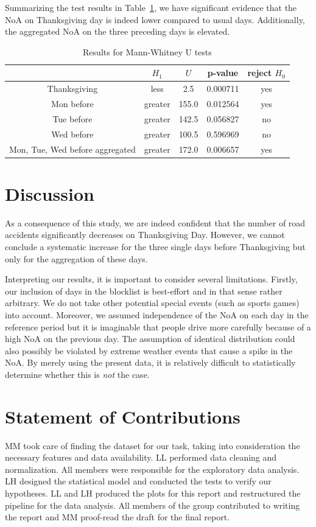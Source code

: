 \documentclass{article}
\begin{document}
Summarizing the test results in Table~\ref{tab:results}, we have significant
evidence that the NoA on Thanksgiving day is indeed lower compared to usual
days. Additionally, the aggregated NoA on the three preceding days is elevated.

\begin{table}[H]
  \centering
  \begin{tabular}{c c c c c}
    \toprule
    & $H_1$ & $U$ & p-value & reject $H_0$ \\
    \midrule
    Thanksgiving & less & 2.5 & 0.000711 & yes \\
    Mon before & greater & 155.0 & 0.012564 & yes \\
    Tue before & greater & 142.5 & 0.056827 & no \\
    Wed before & greater & 100.5 & 0.596969 & no \\
    Mon, Tue, Wed before aggregated & greater & 172.0 & 0.006657 & yes \\
    \bottomrule
  \end{tabular}
  \caption{Results for Mann-Whitney U tests}\label{tab:results}
\end{table}
\section{Discussion}\label{sec:discussion}
As a consequence of this study, we are indeed confident that the number of road
accidents significantly decreases on Thanksgiving Day. However, we cannot
conclude a systematic increase for the three single days before Thanksgiving but
only for the aggregation of these days.

Interpreting our results, it is important to consider several limitations.
Firstly, our inclusion of days in the blocklist is best-effort and in that sense
rather arbitrary. We do not take other potential special events (such as sports
games) into account. Moreover, we assumed independence of the NoA on each day in
the reference period but it is imaginable that people drive more carefully
because of a high NoA on the previous day. The assumption of identical
distribution could also possibly be violated by extreme weather events that
cause a spike in the NoA. By merely using the present data, it is relatively
difficult to statistically determine whether this is \emph{not} the case.

\section{Statement of Contributions}
MM took care of finding the dataset for our task, taking into consideration the
necessary features and data availability. LL performed data cleaning and
normalization. All members were responsible for the exploratory data analysis.
LH designed the statistical model and conducted the tests to verify our
hypotheses. LL and LH produced the plots for this report and restructured the
pipeline for the data analysis. All members of the group contributed to writing
the report and MM proof-read the draft for the final report.
\printbibliography
\end{document}
